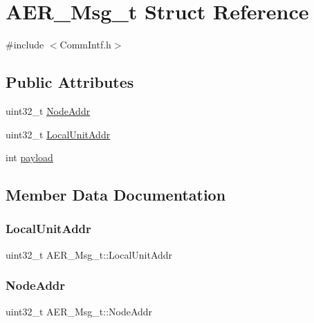\hypertarget{structAER__Msg__t}{}\section{A\+E\+R\+\_\+\+Msg\+\_\+t Struct Reference}
\label{structAER__Msg__t}


{\ttfamily \#include $<$Comm\+Intf.\+h$>$}

\subsection*{Public Attributes}
\begin{DoxyCompactItemize}
\item 
uint32\+\_\+t \mbox{\hyperlink{structAER__Msg__t_a53f713c1fde5f06d3237e5725af13089}{Node\+Addr}}
\item 
uint32\+\_\+t \mbox{\hyperlink{structAER__Msg__t_accdeb4a04e38cd3482a833a614578361}{Local\+Unit\+Addr}}
\item 
int \mbox{\hyperlink{structAER__Msg__t_a6ad37487067cdec83aba923dbfecd043}{payload}}
\end{DoxyCompactItemize}


\subsection{Member Data Documentation}
\mbox{\label{structAER__Msg__t_accdeb4a04e38cd3482a833a614578361}} 
\subsubsection{\texorpdfstring{Local\+Unit\+Addr}{LocalUnitAddr}}
{\footnotesize\ttfamily uint32\+\_\+t A\+E\+R\+\_\+\+Msg\+\_\+t\+::\+Local\+Unit\+Addr}

\mbox{\label{structAER__Msg__t_a53f713c1fde5f06d3237e5725af13089}} 
\subsubsection{\texorpdfstring{Node\+Addr}{NodeAddr}}
{\footnotesize\ttfamily uint32\+\_\+t A\+E\+R\+\_\+\+Msg\+\_\+t\+::\+Node\+Addr}

